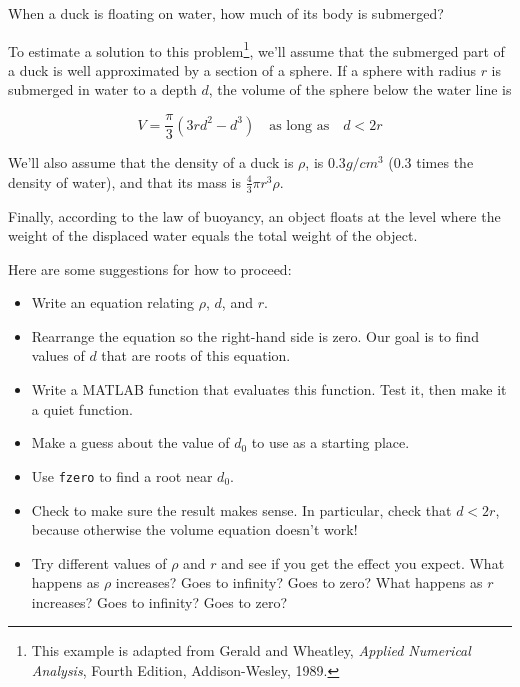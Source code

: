 \documentclass[
]{book}
\numberwithin{Answer}{chapter}
\numberwithin{Exercise}{chapter}
\begin{document}
\begin{ex}
\label{ex:duck}

When a duck is floating on water, how much of its body is submerged?

To estimate a solution to this problem\footnote{This example is adapted from Gerald and Wheatley,
{\em Applied Numerical Analysis}, Fourth Edition, Addison-Wesley,
1989.}, we'll assume that the submerged part of a duck is well approximated by a section of a sphere.
If a sphere with radius $r$ is submerged in water to a depth $d$, the
volume of the sphere below the water line is

\[ V = \frac{\pi}{3} (3r d^2 - d^3) \quad
\mbox{as long as} \quad d < 2 r  \]

We'll also assume that the density of a duck is $\rho$, is $0.3 g / cm^3$ (0.3 times the density of water), and that its mass is $\frac{4}{3} \pi r^3 \rho$.

Finally, according to the law of buoyancy, an object floats at the level where the weight of the displaced water equals the total weight of the object.

Here are some suggestions for how to proceed:

\begin{itemize}

\item Write an equation relating $\rho$, $d$, and $r$.

\item Rearrange the equation so the right-hand side is zero.
Our goal is to find values of $d$ that are roots of this equation.

\item Write a MATLAB function that evaluates this function.  Test it,
   then make it a quiet function.

\item Make a guess about the value of $d_0$ to use as a starting place.

\item Use {\tt fzero} to find a root near $d_0$.

\item Check to make sure the result makes sense.  In particular,
   check that $d < 2 r$, because otherwise the volume equation
   doesn't work!

\item Try different values of $\rho$ and $r$ and see if you get the
  effect you expect.  What happens as $\rho$ increases?  Goes to
  infinity?  Goes to zero?  What happens as $r$ increases?  Goes to
  infinity?  Goes to zero?

\end{itemize}

\end{ex}
\end{document}
